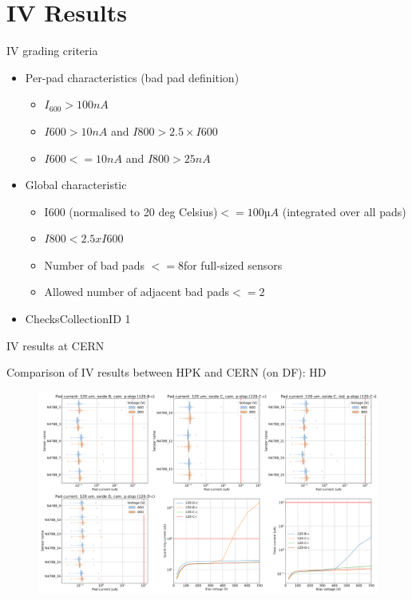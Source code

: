 \documentclass{beamer}
\begin{document}
  

\section{IV Results}

\begin{frame}{IV grading criteria}
   \begin{itemize}
       \item \alert{Per-pad} characteristics (\alert{bad pad} definition)
            \begin{itemize}
                \item $ {I}_{600} > 100 nA $
                \item $ I600 > 10 nA  $  and $ I800 > 2.5 \times I600 $
                \item $ I600 <= 10 nA $  and $ I800 > 25 nA $
            \end{itemize}
       \item \alert{Global} characteristic
            \begin{itemize}
                \item I600 (normalised to 20 deg Celsius)$ <= 100 µA $ (integrated over all pads)
                \item $ I800 < 2.5 x I600 $
                \item Number of bad pads $ <= 8 $for full-sized sensors
                \item Allowed number of adjacent bad pads$ <= 2$
            \end{itemize}
       \item ChecksCollectionID 1
   \end{itemize}

\end{frame}

\begin{frame}{IV results at CERN }
    
\end{frame}


\begin{frame}{Comparison of IV results between HPK and CERN (on DF): HD}
  \begin{figure}
    \includegraphics[width=.8\textwidth]{plots/IV_CERN_HPK_120um.png}
  \end{figure}
\end{frame}
\end{document}
